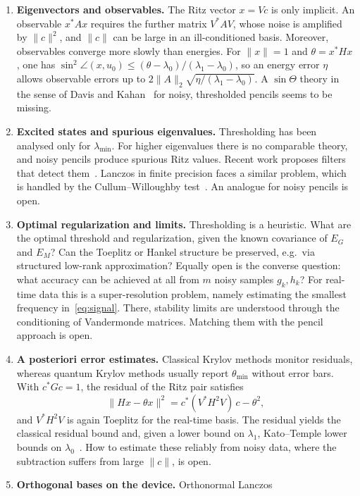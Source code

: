 \documentclass[11pt,a4paper]{article}
\begin{document}
\begin{enumerate}
\item \textbf{Eigenvectors and observables.} The Ritz vector $x=Vc$ is
  only implicit. An observable $x^*Ax$ requires the further matrix
  $V^*AV$, whose noise is amplified by $\|c\|^2$, and $\|c\|$ can be large
  in an ill-conditioned basis. Moreover, observables converge more slowly
  than energies. For $\|x\|=1$ and $\theta=x^*Hx$, one has
  $\sin^2\angle(x,u_0)\le(\theta-\lambda_0)/(\lambda_1-\lambda_0)$, so an energy
  error $\eta$ allows observable errors up to
  $2\|A\|_2\sqrt{\eta/(\lambda_1-\lambda_0)}$. A $\sin\Theta$ theory in the
  sense of Davis and Kahan~\cite{DK70} for noisy, thresholded pencils
  seems to be missing.
\item \textbf{Excited states and spurious eigenvalues.} Thresholding has
  been analysed only for $\lambda_{\min}$. For higher eigenvalues there is no
  comparable theory, and noisy pencils produce spurious Ritz values.
  Recent work proposes filters that detect them~\cite{OZG26}. Lanczos in
  finite precision faces a similar problem, which is handled by the
  Cullum--Willoughby test~\cite{CW85}. An analogue for noisy pencils is
  open.
\item \textbf{Optimal regularization and limits.} Thresholding is a
  heuristic. What are the optimal threshold and regularization, given
  the known covariance of $E_G$ and $E_M$? Can the Toeplitz or Hankel
  structure be preserved, e.g.\ via structured low-rank approximation?
  Equally open is the converse question: what accuracy can be achieved
  at all from $m$ noisy samples $g_k,h_k$? For real-time data this is a
  super-resolution problem, namely estimating the smallest frequency
  in~\eqref{eq:signal}. There, stability limits are understood through
  the conditioning of Vandermonde matrices. Matching them with the
  pencil approach is open.
\item \textbf{A posteriori error estimates.} Classical Krylov methods
  monitor residuals, whereas quantum Krylov methods usually report
  $\theta_{\min}$ without error bars. With $c^*Gc=1$, the residual of the Ritz
  pair satisfies
  \[
    \|Hx-\theta x\|^2=c^*(V^*H^2V)\,c-\theta^2,
  \]
  and $V^*H^2V$ is again Toeplitz for the real-time basis. The residual
  yields the classical residual bound and, given a lower bound on
  $\lambda_1$, Kato--Temple lower bounds on $\lambda_0$~\cite{Parlett98}. How to
  estimate these reliably from noisy data, where the subtraction suffers
  from large $\|c\|$, is open.
\item \textbf{Orthogonal bases on the device.} Orthonormal Lanczos

\end{enumerate}
\end{document}
